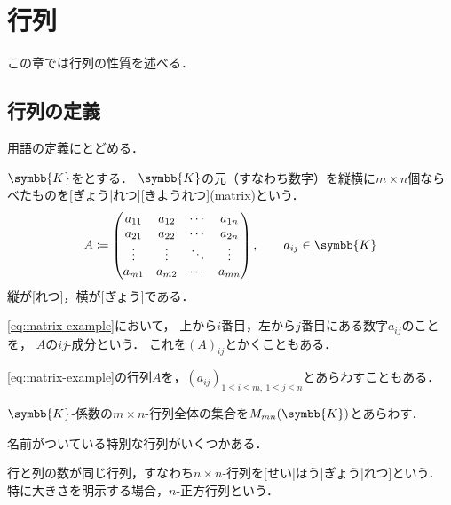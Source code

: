 \documentclass[../sotsu.tex]{subfiles}
\begin{document}
\section{行列}
\label{sec:matrix}

この章では行列の性質を述べる．

\subsection{行列の定義}

用語の定義にとどめる．

\begin{definition}[行列]
    $\symbb{K}$をとする．
    $\symbb{K}$の元（すなわち数字）を縦横に$m \times n$個ならべたものを[ぎょう|れつ][きようれつ](matrix)という．
    \begin{equation}
        \label{eq:matrix-example}
        A \coloneq 
        \begin{pmatrix}
            a_{11}  &  a_{12}  &  \cdots  &  a_{1n}  \\
            a_{21}  &  a_{22}  &  \cdots  &  a_{2n}  \\
            \vdots  &  \vdots  &  \ddots  &  \vdots  \\
            a_{m1}  &  a_{m2}  &  \cdots  &  a_{mn}
        \end{pmatrix}
        , \qquad 
        a_{ij} \in \symbb{K}
    \end{equation}
    縦が[れつ]，横が[ぎょう]である．

    \cref{eq:matrix-example}において，
    上から$i$番目，左から$j$番目にある数字$a_{ij}$のことを，
    $A$の$ij$-成分という．
    これを$(A)_{ij}$とかくこともある．
\end{definition}

\cref{eq:matrix-example}の行列$A$を，$(a_{ij})_{1 \leq i \leq m, \  1 \leq j \leq n}$とあらわすこともある．

\begin{definition}
    \label{dfn:set-of-matrix}
    $\symbb{K}$-係数の$m \times n$-行列全体の集合を$M_{mn}(\symbb{K})$とあらわす．
\end{definition}

名前がついている特別な行列がいくつかある．

\begin{definition}[正方行列]
    行と列の数が同じ行列，すなわち$n \times n$-行列を[せい|ほう|ぎょう|れつ]という．
    特に大きさを明示する場合，$n$-正方行列という．
\end{definition}
\end{document}
